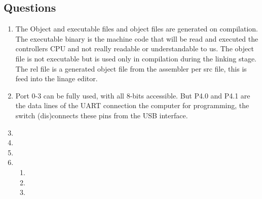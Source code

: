 \documentclass[11pt]{article}
\begin{document}
\begin{preview}
\section{Questions}
\begin{enumerate}
        \item The Object and executable files and object files are generated on compilation. The executable binary is the machine code that will be read and executed the controllers CPU and not really readable or understandable to us. The object file is not executable but is used only in compilation during the linking stage. The rel file is a generated object file from the assembler per src file, this is feed into the linage editor.
        \item Port 0-3 can be fully used, with all 8-bits accessible. But P4.0 and P4.1 are the data lines of the UART connection the computer for programming, the switch (dis)connects these pins from the USB interface.
        \item 
        \item 
        \item 
        \item 
        \begin{enumerate}
                \item 
                \item 
                \item 
        \end{enumerate}
\end{enumerate}

\end{preview}
\end{document}
